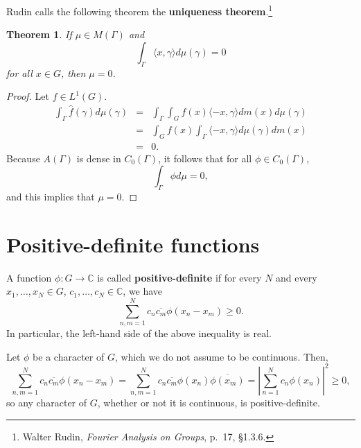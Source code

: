 \documentclass{article}
\newcommand{\inner}[2]{\langle #1, #2 \rangle}
\newtheorem{theorem}{Theorem}
\begin{document}
Rudin calls the following theorem the \textbf{uniqueness theorem}.\footnote{Walter
Rudin, {\em Fourier Analysis on Groups}, p.~17, \S 1.3.6.}

\begin{theorem}
If $\mu \in M(\Gamma)$ and 
\[
\int_\Gamma \inner{x}{\gamma} d\mu(\gamma)=0
\]
for all $x \in G$, then $\mu=0$.
\label{uniqueness}
\end{theorem}
\begin{proof}
Let $f \in L^1(G)$.
\begin{eqnarray*}
\int_\Gamma \hat{f}(\gamma) d\mu(\gamma)&=&\int_\Gamma \int_G f(x) \inner{-x}{\gamma} dm(x) d\mu(\gamma)\\
&=&\int_G f(x) \int_\Gamma \inner{-x}{\gamma} d\mu(\gamma) dm(x)\\
&=&0.
\end{eqnarray*}
Because $A(\Gamma)$ is dense in $C_0(\Gamma)$, it follows that for all $\phi \in C_0(\Gamma)$, 
\[
\int_\Gamma \phi d\mu=0,
\]
and this implies that $\mu=0$. 
\end{proof}


\section{Positive-definite functions}
A function $\phi:G \to \mathbb{C}$ is called \textbf{positive-definite} if for every $N$ and every $x_1,\ldots,x_N \in G$, $c_1,\ldots,c_N \in \mathbb{C}$, we have
\begin{equation}
\sum_{n,m=1}^N c_n \overline{c_m} \phi(x_n-x_m) \geq 0.
\label{posdef}
\end{equation}
In particular, the left-hand side of the above inequality is real. 

Let $\phi$ be a character of $G$, which we do not assume to be continuous. Then,
\[
\sum_{n,m=1}^N c_n \overline{c_m} \phi(x_n-x_m) = \sum_{n,m=1}^N c_n \overline{c_m} \phi(x_n) \overline{\phi(x_m)} 
=\left| \sum_{n=1}^N c_n \phi(x_n)  \right|^2 \geq 0,
\]
so any character of $G$, whether or not it is continuous, is positive-definite.
\end{document}
